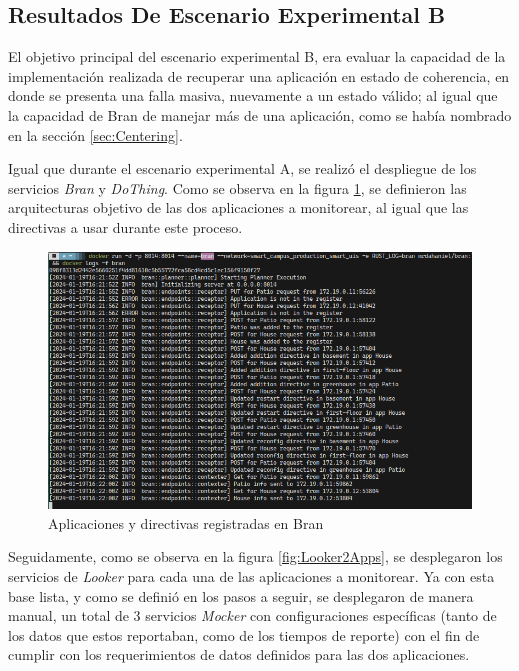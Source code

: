 \subsection{Resultados De Escenario Experimental B}

El objetivo principal del escenario experimental B, era evaluar la capacidad de la implementación realizada de recuperar una aplicación en estado de coherencia, en donde se presenta una falla masiva, nuevamente a un estado válido; al igual que la capacidad de Bran de manejar más de una aplicación, como se había nombrado en la sección \ref{sec:Centering}.

Igual que durante el escenario experimental A, se realizó el despliegue de los servicios \textit{Bran} y \textit{DoThing}. Como se observa en la figura \ref{fig:Bran2Apps}, se definieron las arquitecturas objetivo de las dos aplicaciones a monitorear, al igual que las directivas a usar durante este proceso.

\begin{figure}[ht]
    \centering
    \caption{Aplicaciones y directivas registradas en Bran}
    \label{fig:Bran2Apps}
    \includegraphics[width=\linewidth]{images/BranBScenarioDeclarition.png}
    \vspace{-4mm}
\end{figure}

Seguidamente, como se observa en la figura \ref{fig:Looker2Apps}, se desplegaron los servicios de \textit{Looker} para cada una de las aplicaciones a monitorear. Ya con esta base lista, y como se definió en los pasos a seguir, se desplegaron de manera manual, un total de 3 servicios \textit{Mocker} con configuraciones específicas (tanto de los datos que estos reportaban, como de los tiempos de reporte) con el fin de cumplir con los requerimientos de datos definidos para las dos aplicaciones. 

